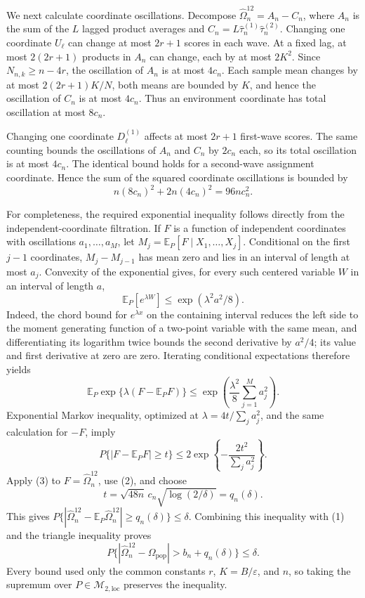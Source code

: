 We next calculate coordinate oscillations.  Decompose \(\widehat\Omega_n^{12}=A_n-C_n\), where \(A_n\) is the sum of the \(L\) lagged product averages and
\(C_n=L\widehat\tau_n^{(1)}\widehat\tau_n^{(2)}\).  Changing one coordinate \(U_\ell\) can change at most \(2r+1\) scores in each wave.  At a fixed lag, at most \(2(2r+1)\) products in \(A_n\) can change, each by at most \(2K^2\).  Since \(N_{n,k}\ge n-4r\), the oscillation of \(A_n\) is at most \(4c_n\).  Each sample mean changes by at most \(2(2r+1)K/N\), both means are bounded by \(K\), and hence the oscillation of \(C_n\) is at most \(4c_n\).  Thus an environment coordinate has total oscillation at most \(8c_n\).

Changing one coordinate \(D_\ell^{(1)}\) affects at most \(2r+1\) first-wave scores.  The same counting bounds the oscillations of \(A_n\) and \(C_n\) by \(2c_n\) each, so its total oscillation is at most \(4c_n\).  The identical bound holds for a second-wave assignment coordinate.  Hence the sum of the squared coordinate oscillations is bounded by
\[
 n(8c_n)^2+2n(4c_n)^2=96n c_n^2. \tag{2}
\]

For completeness, the required exponential inequality follows directly from the independent-coordinate filtration.  If \(F\) is a function of independent coordinates with oscillations \(a_1,\ldots,a_M\), let \(M_j=\mathbb E_P[F\mid X_1,\ldots,X_j]\).  Conditional on the first \(j-1\) coordinates, \(M_j-M_{j-1}\) has mean zero and lies in an interval of length at most \(a_j\).  Convexity of the exponential gives, for every such centered variable \(W\) in an interval of length \(a\),
\[
 \mathbb E_P[e^{\lambda W}]
 \le \exp(\lambda^2a^2/8).
\]
Indeed, the chord bound for \(e^{\lambda x}\) on the containing interval reduces the left side to the moment generating function of a two-point variable with the same mean, and differentiating its logarithm twice bounds the second derivative by \(a^2/4\); its value and first derivative at zero are zero.  Iterating conditional expectations therefore yields
\[
 \mathbb E_P\exp\{\lambda(F-\mathbb E_PF)\}
 \le\exp\!\left(\frac{\lambda^2}{8}\sum_{j=1}^M a_j^2\right).
\]
Exponential Markov inequality, optimized at \(\lambda=4t/\sum_j a_j^2\), and the same calculation for \(-F\), imply
\[
 P\{|F-\mathbb E_PF|\ge t\}
 \le2\exp\!\left\{-\frac{2t^2}{\sum_j a_j^2}\right\}. \tag{3}
\]
Apply (3) to \(F=\widehat\Omega_n^{12}\), use (2), and choose
\[
 t=\sqrt{48n}\,c_n\sqrt{\log(2/\delta)}=q_n(\delta).
\]
This gives \(P\{|\widehat\Omega_n^{12}-\mathbb E_P\widehat\Omega_n^{12}|\ge q_n(\delta)\}\le\delta\).  Combining this inequality with (1) and the triangle inequality proves
\[
 P\{|\widehat\Omega_n^{12}-\Omega_{\mathrm{pop}}|>b_n+q_n(\delta)\}\le\delta.
\]
Every bound used only the common constants \(r\), \(K=B/\varepsilon\), and \(n\), so taking the supremum over \(P\in\mathcal M_{2,\mathrm{loc}}\) preserves the inequality.

